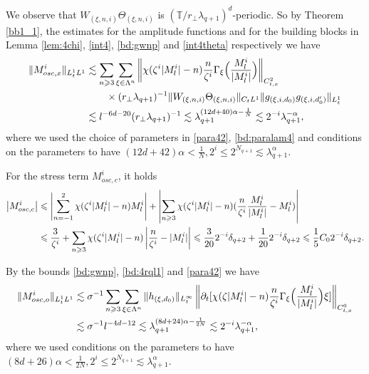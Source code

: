 \documentclass[10pt,a4paper]{amsart}
\numberwithin{equation}{section}
\def\({{\Big(}}
\def\){{\Big)}}
\newcommand{\norm}[1]{\left\|#1\right\|}
\def\geq{\geqslant}
\def\leq{\leqslant}
\def\({{\Big(}}
\def\){{\Big)}}
\def\geq{\geqslant}
\def\leq{\leqslant}
\begin{document}
We observe that $W_{(\xi,n,i)}\Theta_{(\xi,n,i)}$ is $(\mathbb{T}/r_\perp\lambda_{q+1})^d$-periodic. So by  Theorem \ref{bb1_1},  the estimates for the amplitude functions and for the building blocks  in Lemma \ref{lem:4chi}, \eqref{int4},  \eqref{bd:gwnp} and \eqref{int4theta} respectively    we have
\begin{align}
\|M^{i}_{osc,x} \|_{L^1_tL^1}
&\lesssim\sum_{n\geq3}\sum_{\xi\in\Lambda^{n}}\norm{\chi(\zeta^{i}|M^{i}_l|-n)\frac{n}{\zeta^{i}}\Gamma_{\xi}\(\frac{M^{i}_l}{|M^{i}_l|}\)}_{C_{t,x}^2}\notag\\ 
&\quad\quad\times (r_\perp\lambda_{q+1})^{-1}\|W_{(\xi,n,i)}\Theta_{(\xi,n,i)}\|_{C_tL^{1}}\|g_{(\xi,i,d_0)}g_{(\xi,i,d_0')}\|_{L_t^1}\notag\\
&\lesssim l^{-6d-20}(r_\perp\lambda_{q+1})^{-1}\lesssim \lambda_{q+1}^{(12d+40)\alpha-\frac{1}{N}}
\lesssim2^{-i} \lambda_{q+1}^{-\alpha}, \notag
\end{align}
where we used the choice of parameters in \eqref{para42}, \eqref{bd:paralam4} and  conditions on the parameters to have $(12d+42)\alpha<\frac{1}{N},2^i\leq2^{N_{q+1}}\lesssim \lambda_{q+1}^\alpha$.

For the stress term $M^{i}_{osc,c}$, it holds
\begin{align}
     \left| M_{osc,c}^i\right|&\leq \left|  \sum_{n=-1}^{2}\chi(\zeta^i|M_l^i|-n)M_l^i\right|+\left|\sum_{n\geq3}\chi(\zeta^i|M_l^i|-n)(\frac{n}{\zeta^i}\frac{M_l^i}{|M_l^i|}- M_l^i)\right|\notag\\
     &\leq \frac{3}{\zeta^i}+\sum_{n\geq3}\chi(\zeta^i|M_l^i|-n)\left|\frac{n}{\zeta^i}- |M_l^i|\right|\leq \frac{3}{20}2^{-i}\delta_{q+2}+\frac{1}{20}2^{-i}\delta_{q+2}
     \leq \frac15C_02^{-i}\delta_{q+2}.\notag
\end{align}

 By the bounds  \eqref{bd:gwnp}, \eqref{bd:4rql1} and \eqref{para42}  we have
\begin{align}
   \|  M^{i}_{osc,o}\|_{L^1_tL^1}&\lesssim \sigma^{-1}\sum_{n\geq3}\sum_{\xi\in\Lambda^{n}}\|h_{(\xi,d_0)}\|_{L_t^\infty}\norm{\partial_t[\chi(\zeta|M_l^i|-n)\frac{n}{\zeta^i}\Gamma_{\xi}\(\frac{M_l^i}{|M_l^i|}\)\xi]}_{C_{t,x}^0}\notag\\ 
   &\lesssim  \sigma^{-1}l^{-4d-12}
   \lesssim \lambda_{q+1}^{(8d+24)\alpha-\frac1{2N}}
   \lesssim 2^{-i}\lambda_{q+1}^{-\alpha},\notag
\end{align}
where we used   conditions on the parameters to have $(8d+26)\alpha<\frac{1}{2N},2^i\leq2^{N_{q+1}}\lesssim \lambda_{q+1}^\alpha$. %
\end{document}
